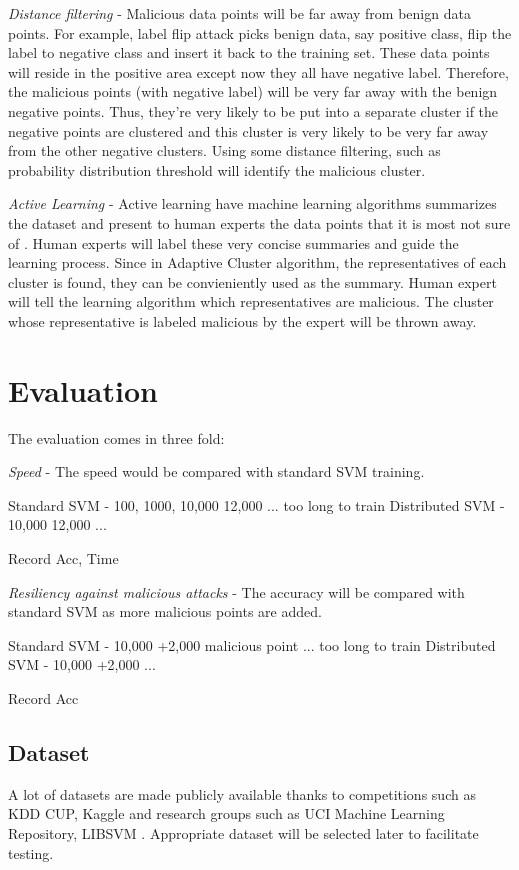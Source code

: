 \documentclass[10pt,conference,compsocconf,letterpaper]{IEEEtran}
\begin{document}
\textit{Distance filtering} - Malicious data points will be far away from benign data points. For example, label flip attack \cite{xiao12} picks benign data, say positive class, flip the label to negative class and insert it back to the training set. These data points will reside in the positive area except now they all have negative label. Therefore, the malicious points (with negative label) will be very far away with the benign negative points. Thus, they're very likely to be put into a separate cluster if the negative points are clustered and this cluster is very likely to be very far away from the other negative clusters. Using some distance filtering, such as probability distribution threshold will identify the malicious cluster.

\textit{Active Learning} - Active learning have machine learning algorithms summarizes the dataset and present to human experts the data points that it is most not sure of \cite{reghavan06}. Human experts will label these very concise summaries and guide the learning process. Since in Adaptive Cluster algorithm, the representatives of each cluster is found, they can be convieniently used as the summary. Human expert will tell the learning algorithm which representatives are malicious. The cluster whose representative is labeled malicious by the expert will be thrown away.

\section{Evaluation}

The evaluation comes in three fold:

\textit{Speed} - The speed would be compared with standard SVM training.

Standard SVM	- 100, 1000, 10,000 12,000 ... too long to train
Distributed SVM	- 10,000 12,000 ... 

Record Acc, Time

\textit{Resiliency against malicious attacks} - The accuracy will be compared with standard SVM as more malicious points are added.

Standard SVM    - 10,000 +2,000 malicious point ... too long to train
Distributed SVM - 10,000 +2,000 ... 

Record Acc

\subsection{Dataset}
A lot of datasets are made publicly available thanks to competitions such as KDD CUP, Kaggle and research groups such as UCI Machine Learning Repository, LIBSVM \cite{kddcup,kaggle,uci,libsvm}. Appropriate dataset will be selected later to facilitate testing.
\end{document}
